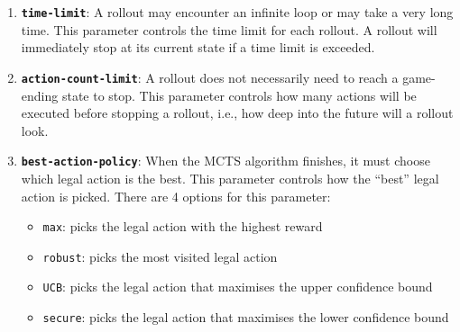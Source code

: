 \begin{enumerate}
  \item \textbf{\texttt{time-limit}}: A rollout may encounter an infinite loop or may take a very long time. This parameter controls the time limit for each rollout. A rollout will immediately stop at its current state if a time limit is exceeded. %
  \item \textbf{\texttt{action-count-limit}}: A rollout does not necessarily need to reach a game-ending state to stop. This parameter controls how many actions will be executed before stopping a rollout, i.e., how deep into the future will a rollout look.
  \item \textbf{\texttt{best-action-policy}}: When the MCTS algorithm finishes, it must choose which legal action is the best. This parameter controls how the ``best'' legal action is picked. There are 4 options for this parameter:
  \begin{itemize}
    \item \texttt{max}: picks the legal action with the highest reward
    \item \texttt{robust}: picks the most visited legal action
    \item \texttt{UCB}: picks the legal action that maximises the upper confidence bound
    \item \texttt{secure}: picks the legal action that maximises the lower confidence bound
  \end{itemize}
\end{enumerate}





